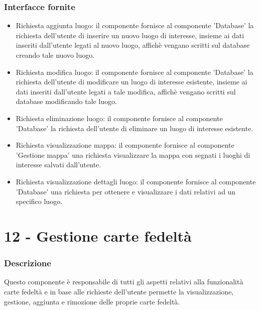 \documentclass[a4paper,12pt]{article}
\begin{document}
\subsubsection*{Interfacce fornite}
\begin{itemize} \setlength\itemsep{0.01em}
\item {\sffamily Richiesta aggiunta luogo}: il componente fornisce al componente 'Database' la richiesta dell'utente di inserire un nuovo luogo di interesse, insieme ai dati inseriti dall'utente legati al nuovo luogo, affichè vengano scritti sul database creando tale nuovo luogo.
\item {\sffamily Richiesta modifica luogo}: il componente fornisce al componente 'Database'  la richiesta dell'utente di modificare un luogo di interesse esistente, insieme ai dati inseriti dall'utente legati a tale modifica, affichè vengano scritti sul database modificando tale luogo.
\item {\sffamily Richiesta eliminazione luogo}: il componente fornisce al componente 'Database' la richiesta dell'utente di eliminare un luogo di interesse esistente.
\item {\sffamily Richiesta visualizzazione mappa}: il componente fornisce al componente 'Gestione mappa' una richiesta visualizzare la mappa con segnati i luoghi di interesse salvati dall'utente.
\item {\sffamily Richiesta visualizzazione dettagli luogo}: il componente fornisce al componente 'Database' una richiesta per ottenere e visualizzare i dati relativi ad un specifico luogo.
\end{itemize}



\section*{12 -  Gestione carte fedeltà}
\subsubsection*{Descrizione}
Questo componente è responsabile di tutti gli aspetti relativi alla funzionalità carte fedeltà e in base alle richieste dell'utente permette la visualizzazione, gestione, aggiunta e rimozione delle proprie carte fedeltà.
\end{document}
